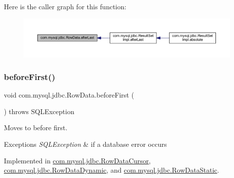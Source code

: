 Here is the caller graph for this function\+:
\nopagebreak
\begin{figure}[H]
\begin{center}
\leavevmode
\includegraphics[width=350pt]{interfacecom_1_1mysql_1_1jdbc_1_1_row_data_a465a997f2fddb9de5ee12340944084fc_icgraph}
\end{center}
\end{figure}
\mbox{\label{interfacecom_1_1mysql_1_1jdbc_1_1_row_data_a3c1836b8c63ae7d859b8b0f1613ef244}} 
\subsubsection{\texorpdfstring{before\+First()}{beforeFirst()}}
{\footnotesize\ttfamily void com.\+mysql.\+jdbc.\+Row\+Data.\+before\+First (\begin{DoxyParamCaption}{ }\end{DoxyParamCaption}) throws S\+Q\+L\+Exception}

Moves to before first.


\begin{DoxyExceptions}{Exceptions}
{\em S\+Q\+L\+Exception} & if a database error occurs \\
\hline
\end{DoxyExceptions}


Implemented in \mbox{\hyperlink{classcom_1_1mysql_1_1jdbc_1_1_row_data_cursor_abdc75072380b9002e7011451143527c4}{com.\+mysql.\+jdbc.\+Row\+Data\+Cursor}}, \mbox{\hyperlink{classcom_1_1mysql_1_1jdbc_1_1_row_data_dynamic_a16cbf687cace7fe4bf5701e9233c733f}{com.\+mysql.\+jdbc.\+Row\+Data\+Dynamic}}, and \mbox{\hyperlink{classcom_1_1mysql_1_1jdbc_1_1_row_data_static_a54d6e62be02d4dac8e48a6eef0b2d839}{com.\+mysql.\+jdbc.\+Row\+Data\+Static}}.

